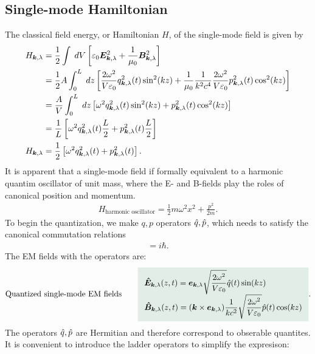 \subsection{Single-mode Hamiltonian}
The classical field energy, or Hamiltonian $H$, of the single-mode field is given by 
\begin{align*}
    H_{\bm{k},\lambda}&=\frac{1}{2}\int\;dV\left[\varepsilon_0\bm{E}_{\bm{k},\lambda}^2+\frac{1}{\mu_0}\bm{B}_{\bm{k},\lambda}^2\right]\\
    &=\frac{1}{2}A\int_0^L\;dz\left[\frac{2\omega^2}{V\varepsilon_0}q_{\bm{k},\lambda}^2(t)\sin^2(kz)+\frac{1}{\mu_0}\frac{1}{k^2c^4}\frac{2\omega^2}{V\varepsilon_0}p_{\bm{k},\lambda}^2(t)\cos^2(kz)\right]\\
    &=\frac{A}{V}\int_0^L\;dz\left[\omega^2q_{\bm{k},\lambda}^2(t)\sin^2(kz)+p_{\bm{k},\lambda}^2(t)\cos^2(kz)\right]\\
    &=\frac{1}{L}\left[\omega^2q_{\bm{k},\lambda}^2(t)\frac{L}{2}+p_{\bm{k},\lambda}^2(t)\frac{L}{2}\right]\\
    H_{\bm{k},\lambda}&=\frac{1}{2}\left[\omega^2q_{\bm{k},\lambda}^2(t)+p_{\bm{k},\lambda}^2(t)\right].
\end{align*}
It is apparent that a single-mode field if formally equivalent to a harmonic quantim oscillator of unit mass, where the E- and B-fields play the 
roles of canonical position and momentum. 
\begin{align*}
    H_{\text{harmonic oscillator}}=\frac{1}{2}m\omega^2x^2+\frac{p^2}{2m}.
\end{align*}
To begin the quantization, we make $q,p$ operators $\hat{q},\hat{p}$, which needs to satisfy the canonical commutation relations 
\begin{align}
    [\hq_{\bk,\lambda},\hp_{\bk,\lambda}]=i\hbar.
\end{align}
The EM fields with the operators are:
\begin{align}
    \shortstack{Quantized single-mode EM fields}\qquad\highlight{\begin{array}{l}
        \bhE_{\bk,\lambda}(z,t)=\be_{\bk,\lambda}\sqrt{\dfrac{2\omega^2}{V\varepsilon_0}}\hq(t)\sin(kz)\\
        \bhB_{\bk,\lambda}(z,t)=(\bk\times\be_{\bk,\lambda})\dfrac{1}{kc^2}\sqrt{\dfrac{2\omega^2}{V\varepsilon_0}}\hp(t)\cos(kz)
    \end{array}}.
\end{align}
The operators $\hat{q},\hat{p}$ are Hermitian and therefore correspond to obserable quantites. It is convenient to introduce the ladder operators to 
simplify the expresison:
